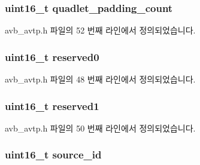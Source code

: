 \subsubsection[{\texorpdfstring{quadlet\+\_\+padding\+\_\+count}{quadlet_padding_count}}]{\setlength{\rightskip}{0pt plus 5cm}uint16\+\_\+t quadlet\+\_\+padding\+\_\+count}\hypertarget{structsix1883__header_ab44f15fc10f7e3c635c930fe3d0551c6}{}\label{structsix1883__header_ab44f15fc10f7e3c635c930fe3d0551c6}


avb\+\_\+avtp.\+h 파일의 52 번째 라인에서 정의되었습니다.

\subsubsection[{\texorpdfstring{reserved0}{reserved0}}]{\setlength{\rightskip}{0pt plus 5cm}uint16\+\_\+t reserved0}\hypertarget{structsix1883__header_af183276fcf5731396c007fa180c6c6b3}{}\label{structsix1883__header_af183276fcf5731396c007fa180c6c6b3}


avb\+\_\+avtp.\+h 파일의 48 번째 라인에서 정의되었습니다.

\subsubsection[{\texorpdfstring{reserved1}{reserved1}}]{\setlength{\rightskip}{0pt plus 5cm}uint16\+\_\+t reserved1}\hypertarget{structsix1883__header_a6b89b86dfe0266be2fc46cf46f6e7b72}{}\label{structsix1883__header_a6b89b86dfe0266be2fc46cf46f6e7b72}


avb\+\_\+avtp.\+h 파일의 50 번째 라인에서 정의되었습니다.

\subsubsection[{\texorpdfstring{source\+\_\+id}{source_id}}]{\setlength{\rightskip}{0pt plus 5cm}uint16\+\_\+t source\+\_\+id}\hypertarget{structsix1883__header_a66347b57ca499b03efde0826d99533fc}{}\label{structsix1883__header_a66347b57ca499b03efde0826d99533fc}


